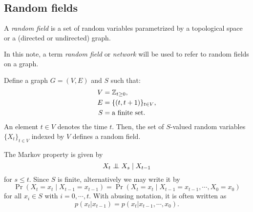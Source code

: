 \documentclass{../exp}
\begin{document}
\subsection{Random fields}
\begin{defn}
A \emph{random field} is a set of random variables parametrized by a topological space or a (directed or undirected) graph.
\end{defn}
\begin{defn}
In this note, a term \emph{random field} or \emph{network} will be used to refer to random fields on a graph.
\end{defn}

\begin{ex}
Define a graph $G=(V,E)$ and $S$ such that:
\begin{align*}
V&=\mathbb{Z}_{t\ge0},\\
E&=\{(t,t+1)\}_{t\in V},\\
S&=\text{a finite set}.
\end{align*}
An element $t\in V$ denotes the time $t$.
Then, the set of $S$-valued random variables $\{X_t\}_{t\in V}$ indexed by $V$ defines a random field.

The Markov property is given by
\[X_t\mathrel{\perp\mspace{-10mu}\perp} X_s\mid X_{t-1}\]
for $s\le t$.
Since $S$ is finite, alternatively we may write it by
\[\Pr(X_t=x_t\mid X_{t-1}=x_{t-1})=\Pr(X_t=x_t\mid X_{t-1}=x_{t-1},\cdots,X_0=x_0)\]
for all $x_i\in S$ with $i=0,\cdots,t$.
With abusing notation, it is often written as
\[p(x_t|x_{t-1})=p(x_t|x_{t-1},\cdots,x_0).\]
\end{ex}
\end{document}
